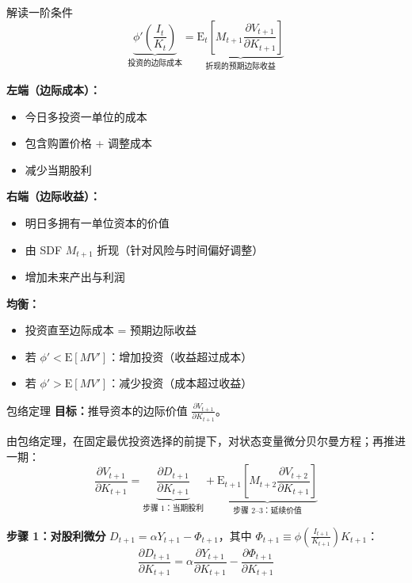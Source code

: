 \documentclass{beamer}
\begin{document}
\begin{frame}[allowframebreaks]{解读一阶条件}
    \begin{equation*}
        \underbrace{\phi'\left(\frac{I_t}{K_t}\right)}_{\text{投资的边际成本}} = \underbrace{\mathrm{E}_t\left[M_{t+1} \frac{\partial V_{t+1}}{\partial K_{t+1}}\right]}_{\text{折现的预期边际收益}}
    \end{equation*}


    \textbf{左端（边际成本）：}
    \begin{itemize}
        \item 今日多投资一单位的成本
        \item 包含购置价格 + 调整成本
        \item 减少当期股利
    \end{itemize}


    \textbf{右端（边际收益）：}
    \begin{itemize}
        \item 明日多拥有一单位资本的价值
        \item 由 SDF $M_{t+1}$ 折现（针对风险与时间偏好调整）
        \item 增加未来产出与利润
    \end{itemize}


    \textbf{均衡：}
    \begin{itemize}
        \item 投资直至边际成本 = 预期边际收益
        \item 若 $\phi' < \mathrm{E}[M V']$：增加投资（收益超过成本）
        \item 若 $\phi' > \mathrm{E}[M V']$：减少投资（成本超过收益）
    \end{itemize}
\end{frame}

\begin{frame}{包络定理}
    \textbf{目标：}推导资本的边际价值 $\frac{\partial V_{t+1}}{\partial K_{t+1}}$。

    由包络定理，在固定最优投资选择的前提下，对状态变量微分贝尔曼方程；再推进一期：
    \begin{equation}\label{equ:envelope}
        \frac{\partial V_{t+1}}{\partial K_{t+1}} = \underbrace{\frac{\partial D_{t+1}}{\partial K_{t+1}}}_{\text{步骤 1：当期股利}} + \underbrace{\mathrm{E}_{t+1}\left[M_{t+2} \frac{\partial V_{t+2}}{\partial K_{t+1}}\right]}_{\text{步骤 2--3：延续价值}}
    \end{equation}

    \textbf{步骤 1：对股利微分} $D_{t+1} = \alpha Y_{t+1} - \Phi_{t+1}$，其中 $\Phi_{t+1} \equiv \phi\!\left(\frac{I_{t+1}}{K_{t+1}}\right) K_{t+1}$：
    \begin{equation*}
        \frac{\partial D_{t+1}}{\partial K_{t+1}} = \alpha \frac{\partial Y_{t+1}}{\partial K_{t+1}} - \frac{\partial \Phi_{t+1}}{\partial K_{t+1}}
    \end{equation*}
\end{frame}
\end{document}
